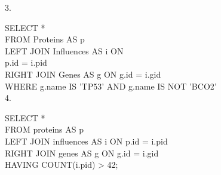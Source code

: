 \documentclass[12pt]{article}
\begin{document}
{3. 

SELECT * \\
FROM Proteins AS p\\
LEFT JOIN Influences AS i ON\\
p.id  = i.pid \\
RIGHT JOIN Genes AS g ON g.id = i.gid\\
WHERE g.name IS 'TP53' AND g.name IS NOT 'BCO2'\\

4.

SELECT * \\
FROM proteins AS p \\
LEFT JOIN influences AS i ON p.id = i.pid \\
RIGHT JOIN genes AS g ON g.id = i.gid \\
HAVING COUNT(i.pid) > 42;\\


}
\end{document}
